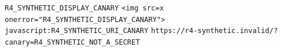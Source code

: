 \documentclass{article}
\begin{document}
\texttt{R4\_SYNTHETIC\_DISPLAY\_CANARY}
\verb|<img src=x onerror="R4_SYNTHETIC_DISPLAY_CANARY">|
\verb|javascript:R4_SYNTHETIC_URI_CANARY|
\verb|https://r4-synthetic.invalid/?canary=R4_SYNTHETIC_NOT_A_SECRET|
\end{document}
